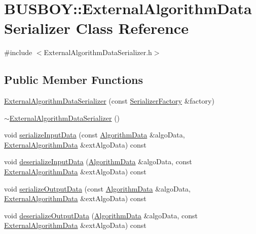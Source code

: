 \hypertarget{classBUSBOY_1_1ExternalAlgorithmDataSerializer}{
\section{BUSBOY::ExternalAlgorithmDataSerializer Class Reference}
\label{classBUSBOY_1_1ExternalAlgorithmDataSerializer}
}


{\ttfamily \#include $<$ExternalAlgorithmDataSerializer.h$>$}\subsection*{Public Member Functions}
\begin{DoxyCompactItemize}
\item 
\hyperlink{classBUSBOY_1_1ExternalAlgorithmDataSerializer_aba63d48d306c9b4c01deb7bbeb3f2895}{ExternalAlgorithmDataSerializer} (const \hyperlink{classBUSBOY_1_1SerializerFactory}{SerializerFactory} \&factory)
\item 
\hyperlink{classBUSBOY_1_1ExternalAlgorithmDataSerializer_aae0a099bb0ce545c1f2d1bd74b710055}{$\sim$ExternalAlgorithmDataSerializer} ()
\item 
void \hyperlink{classBUSBOY_1_1ExternalAlgorithmDataSerializer_a382032041e694cb53c8fe03c5c8dff80}{serializeInputData} (const \hyperlink{classBUSBOY_1_1AlgorithmData}{AlgorithmData} \&algoData, \hyperlink{classBUSBOY_1_1ExternalAlgorithmData}{ExternalAlgorithmData} \&extAlgoData) const 
\item 
void \hyperlink{classBUSBOY_1_1ExternalAlgorithmDataSerializer_af9af42b4d74c605c6da878ddc9f85316}{deserializeInputData} (\hyperlink{classBUSBOY_1_1AlgorithmData}{AlgorithmData} \&algoData, const \hyperlink{classBUSBOY_1_1ExternalAlgorithmData}{ExternalAlgorithmData} \&extAlgoData) const 
\item 
void \hyperlink{classBUSBOY_1_1ExternalAlgorithmDataSerializer_adcae85dc71d98643e0874935b432c1ce}{serializeOutputData} (const \hyperlink{classBUSBOY_1_1AlgorithmData}{AlgorithmData} \&algoData, \hyperlink{classBUSBOY_1_1ExternalAlgorithmData}{ExternalAlgorithmData} \&extAlgoData) const 
\item 
void \hyperlink{classBUSBOY_1_1ExternalAlgorithmDataSerializer_abea197e5350829e1be632e044bc451a0}{deserializeOutputData} (\hyperlink{classBUSBOY_1_1AlgorithmData}{AlgorithmData} \&algoData, const \hyperlink{classBUSBOY_1_1ExternalAlgorithmData}{ExternalAlgorithmData} \&extAlgoData) const 
\end{DoxyCompactItemize}


